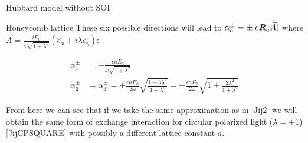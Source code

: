 \begin{section}{Hubbard model without SOI}
\begin{subsection}{Honeycomb lattice}
These six possible directions will lead to $\alpha_a^\pm = \pm |e\boldsymbol{R}_a\vec{A}|$ where $\vec{A}=\frac{iE_0}{\omega\sqrt{1+\lambda^2}}(\hat{e}_x+i\lambda\hat{e}_y)$:

\begin{align}
\alpha_1^\pm &= \pm \frac{eaE_0}{\omega\sqrt{1+\lambda^2}} \\
\alpha_2^\pm &= \alpha_3^\pm = \pm \frac{eaE_0}{2\omega} \sqrt{\frac{1+3\lambda^2}{1+\lambda^2}} = \pm\frac{eaE_0}{2\omega}\sqrt{1+\frac{2\lambda^2}{1+\lambda^2}}
\end{align}

From here we can see that if we take the same approximation as in \ref{Jij2} we will obtain the same form of exchange interaction for circular polarized light ($\lambda=\pm1$) \ref{JijCPSQUARE} with possibly a different lattice constant $a$. 

\end{subsection}

\end{section}

